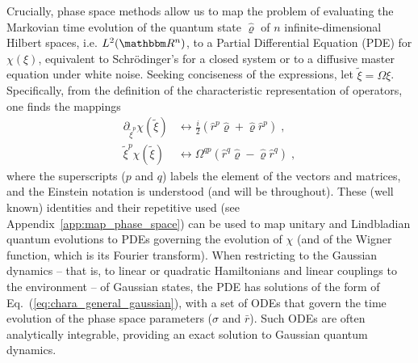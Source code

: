 \documentclass[%
reprint,
superscriptaddress,
nofootinbib,
 amsmath,amssymb,
prx,
floatfix,
]{revtex4-2}
\begin{document}
Crucially, phase space methods allow us to map the problem of evaluating the Markovian time evolution of the quantum state $\hat{\varrho}$ of $n$ infinite-dimensional Hilbert spaces, i.e. $L^2({\mathbbm R^n})$, to a Partial Differential Equation (PDE) for $\chi (\xi)$, equivalent to Schrödinger's for a closed system or to a diffusive master equation under white noise. Seeking conciseness of the expressions, let $\tilde{\xi} = \Omega \xi$. Specifically, from the definition of the characteristic representation of operators, one finds the mappings
\begin{align}
    \partial_{\tilde{\xi}^p} \chi (\tilde{\xi}) &\longleftrightarrow  \frac{i}{2} (\hat{r}^p  \hat{\varrho} + \hat{\varrho} \hat{r}^p ) \;,
    \label{eq:phase_space_corresp1} \\
    \tilde{\xi}^p \chi (\tilde{\xi}) &\longleftrightarrow  \Omega^{qp} (\hat{r}^q \hat{\varrho} -  \hat{\varrho} \hat{r}^q) \;, \label{eq:phase_space_corresp2}
\end{align}
where the superscripts ($p$ and $q$) labels the element of the vectors and matrices, and the Einstein notation is understood (and will be throughout). These (well known) identities and their repetitive used (see Appendix~\ref{app:map_phase_space}) can be used to map unitary and Lindbladian quantum evolutions to PDEs governing the evolution of $\chi$ (and of the Wigner function, which is its Fourier transform). When restricting to the Gaussian dynamics -- that is, to linear or quadratic Hamiltonians and linear couplings to the environment -- of Gaussian states, the PDE has solutions of the form of Eq.~(\ref{eq:chara_general_gaussian}), with a set of ODEs that govern the time evolution of the phase space parameters ($\sigma$ and $\bar{r}$). Such ODEs are often analytically integrable, providing an exact solution to Gaussian quantum dynamics. 
\end{document}
